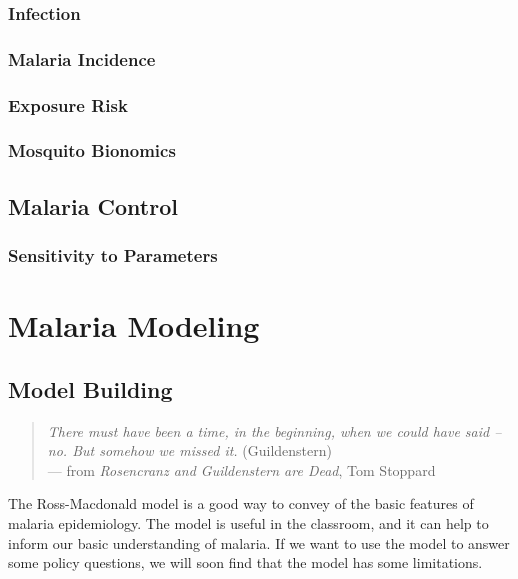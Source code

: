 \documentclass[
]{book}
\begin{document}
\section{Infection}\label{infection}

\section{Malaria Incidence}\label{malaria-incidence}

\section{Exposure Risk}\label{exposure-risk}

\section{Mosquito Bionomics}\label{mosquito-bionomics}

\chapter{Malaria Control}\label{malaria-control}

\section{Sensitivity to Parameters}\label{sensitivity-to-parameters-1}

\part{Malaria Modeling}\label{part-malaria-modeling}

\chapter{Model Building}\label{model-building}

\begin{quote}
\emph{There must have been a time, in the beginning, when we could have said -- no. But somehow we missed it.} (Guildenstern)\\
--- from \emph{Rosencranz and Guildenstern are Dead}, Tom Stoppard
\end{quote}

The Ross-Macdonald model is a good way to convey of the basic features of malaria epidemiology. The model is useful in the classroom, and it can help to inform our basic understanding of malaria. If we want to use the model to answer some policy questions, we will soon find that the model has some limitations.
\end{document}

